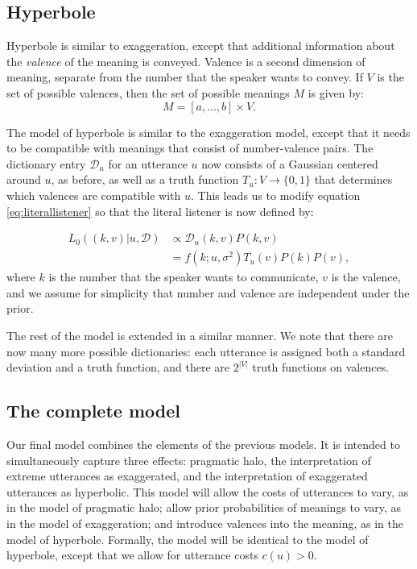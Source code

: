 \documentclass{article} %
\newcommand{\dictionary}{\ensuremath{\mathcal{D}}\xspace}
\begin{document}
\subsection{Hyperbole}

Hyperbole is similar to exaggeration, except that additional information about the \emph{valence} of the meaning is conveyed. Valence is a second dimension of meaning, separate from the number that the speaker wants to convey. If $V$ is the set of possible valences, then the set of possible meanings $M$ is given by:
\begin{equation}
M = [a,...,b] \times V.
\end{equation}

The model of hyperbole is similar to the exaggeration model, except that it needs to be compatible with meanings that consist of number-valence pairs. The dictionary entry $\dictionary_u$ for an utterance $u$ now consists of a Gaussian centered around $u$, as before, as well as a truth function $T_u:V\rightarrow \{0,1\}$ that determines which valences are compatible with $u$. This leads us to modify equation \ref{eq:literallistener} so that the literal listener is now defined by:

\begin{align}\label{eq:valenceliteral}
L_0((k,v) | u, \dictionary) &\propto \dictionary_u(k,v)P(k,v) \\
&=f(k;u,\sigma^2)T_u(v)P(k)P(v),
\end{align}
where $k$ is the number that the speaker wants to communicate, $v$ is the valence, and we assume for simplicity that number and valence are independent under the prior. 

The rest of the model is extended in a similar manner. We note that there are now many more possible dictionaries: each utterance is assigned both a standard deviation and a truth function, and there are $2^{|V|}$ truth functions on valences. 

\subsection{The complete model}

Our final model combines the elements of the previous models. It is intended to simultaneously capture three effects: pragmatic halo, the interpretation of extreme utterances as exaggerated, and the interpretation of exaggerated utterances as hyperbolic. This model will allow the costs of utterances to vary, as in the model of pragmatic halo; allow prior probabilities of meanings to vary, as in the model of exaggeration; and introduce valences into the meaning, as in the model of hyperbole. Formally, the model will be identical to the model of hyperbole, except that we allow for utterance costs $c(u) > 0$. 
\end{document}
